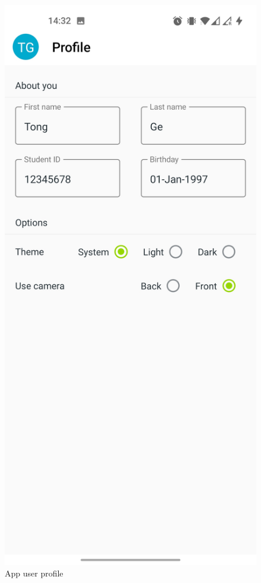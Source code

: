 \begin{minipage}{.5\textwidth}
\begin{figure}[H]
    \centering
    \includegraphics[width=\textwidth]{appendix/imgs/app-profile.jpg}
    \caption{App user profile}
    \label{fig:app-profile}
\end{figure}
\end{minipage}

